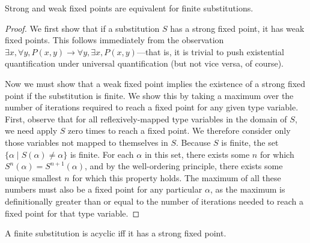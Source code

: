 \documentclass[10pt, letterpaper, oneside]{article}
\begin{document}
\begin{lemma}
  \label{lemma:strong-weak}
  Strong and weak fixed points are equivalent for finite substitutions.
\end{lemma}

\begin{proof}
  We first show that if a substitution \(S\) has a strong fixed point, it has weak fixed points. This follows immediately from the observation \(\exists x, \forall y, P(x,y) \to \forall y, \exists x, P(x,y)\)---that is, it is trivial to push existential quantification under universal quantification (but not vice versa, of course).

  Now we must show that a weak fixed point implies the existence of a strong fixed point if the substitution is finite. We show this by taking a maximum over the number of iterations required to reach a fixed point for any given type variable. First, observe that for all reflexively-mapped type variables in the domain of \(S\), we need apply \(S\) zero times to reach a fixed point. We therefore consider only those variables not mapped to themselves in \(S\). Because \(S\) is finite, the set \(\{\alpha \mid S(\alpha) \ne \alpha\}\) is finite. For each \(\alpha\) in this set, there exists some \(n\) for which \(S^n(\alpha) = S^{n + 1}(\alpha)\), and by the well-ordering principle, there exists some unique smallest \(n\) for which this property holds. The maximum of all these numbers must also be a fixed point for any particular \(\alpha\), as the maximum is definitionally greater than or equal to the number of iterations needed to reach a fixed point for that type variable.
\end{proof}

\begin{lemma}
  \label{lemma:finite-acyclic-strong}
  A finite substitution is acyclic iff it has a strong fixed point.
\end{lemma}
\end{document}
